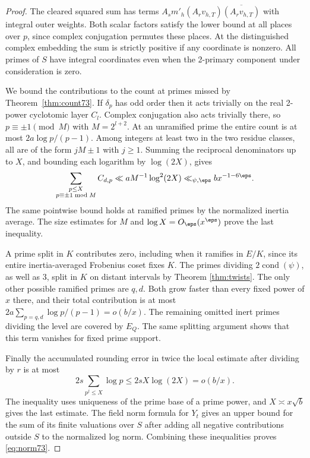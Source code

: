 \documentclass[a4paper,11pt]{article}
\theoremstyle{definition}
\theoremstyle{remark}
\numberwithin{equation}{section}
\begin{document}
\begin{proof}
The cleared squared sum has terms
\(A_s m'_h (A_r v_{h,T})\overline{(A_r v_{h,T})}\) with
integral outer weights. Both scalar factors satisfy the lower
bound at all places over \(p\), since complex conjugation
permutes these places. At the distinguished complex embedding
the sum is strictly positive if any coordinate is nonzero.
All primes of \(S\) have integral coordinates even when the
2-primary component under consideration is zero.

We bound the contributions to the count at primes missed by
Theorem~\ref{thm:count73}. If \(\delta_p\) has odd order then
it acts trivially on the real 2-power cyclotomic layer
\(C_l\). Complex conjugation also acts trivially there, so
\(p\equiv\pm1\pmod M\) with \(M=2^{l+2}\).
At an unramified prime the entire count is at most
\(2a\log p/(p-1)\). Among integers at least two in the
two residue classes, all are of the form \(jM\pm1\)
with \(j\ge1\). Summing the reciprocal denominators up to
\(X\), and bounding each logarithm by \(\log(2X)\), gives
\[
      \sum_{\substack{p\le X\\p\equiv\pm1\bmod M}} C_{d,p}
      \ll a M^{-1}\log^2(2X)
      \ll_{\psi,\eps} b x^{-1-6\eps}.
\]
The same pointwise bound holds at ramified primes by the
normalized inertia average. The size estimates for \(M\) and
\(\log X=O_\eps(x^\eps)\) prove the last inequality.

A prime split in \(K\) contributes zero, including when it
ramifies in \(E/K\), since its entire inertia-averaged
Frobenius coset fixes \(K\). The primes dividing \(2\operatorname{cond}(\psi)\),
as well as 3, split in \(K\) on distant intervals by Theorem \ref{thm:twists}. The only other possible ramified primes are
\(q,d\). Both grow faster than every fixed power of \(x\)
there, and their total contribution is at most
\(2a\sum_{p=q,d}\log p/(p-1)=o(b/x)\).
The remaining omitted inert primes dividing the level are
covered by \(E_Q\). The same splitting argument shows that
this term vanishes for fixed prime support.

Finally the accumulated rounding error in twice the local
estimate after dividing by \(r\) is at most
\[
         2s\sum_{p^j\le X}\log p
             \le 2s X\log(2X)=o(b/x).
\]
The inequality uses uniqueness of the prime base of a prime
power, and \(X\asymp x\sqrt b\) gives the last estimate.
The field norm formula for \(Y_t\) gives an upper bound for
the sum of its finite valuations over \(S\) after adding all
negative contributions outside \(S\) to the normalized log
norm. Combining these inequalities proves \eqref{eq:norm73}.
\end{proof}
\end{document}
